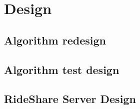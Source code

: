 \section{Design}


\subsection{Algorithm redesign}


\subsection{Algorithm test design}



\subsection{RideShare Server Design}

